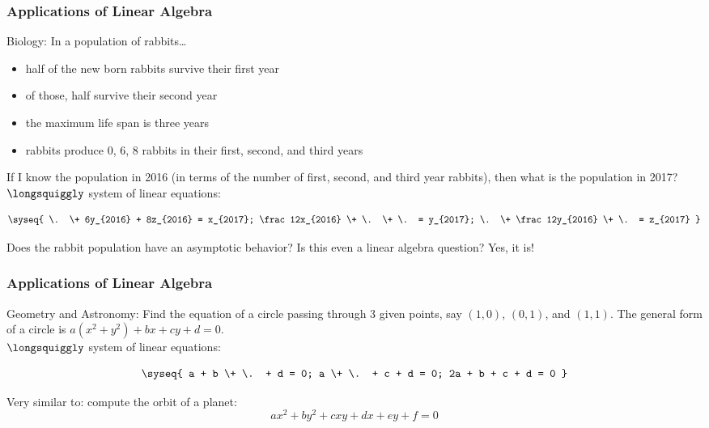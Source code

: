 
\begin{frame}
\frametitle{Applications of Linear Algebra}
\alert{Biology:} In a population of rabbits\ldots
\begin{itemize}
\item half of the new born rabbits survive their first year
\item of those, half survive their second year
\item the maximum life span is three years
\item rabbits produce 0, 6, 8 rabbits in their first, second, and third years
\end{itemize}

\pause\medskip
If I know the population in 2016 (in terms of the number of first, second, and
third year rabbits), then what is the population in 2017?
\pause\\[5mm]
$\longsquiggly$ system of linear equations:

\begin{webonly}
  \[\syseq{
    \. \+ 6y_{2016} + 8z_{2016} = x_{2017};
    \frac 12x_{2016} \+ \. \+ \. = y_{2017};
    \. \+ \frac 12y_{2016} \+ \. = z_{2017} 
  }\]
\end{webonly}

\pause

\begin{ques}
  Does the rabbit population have an asymptotic behavior?  Is this even a linear
  algebra question?
  \pause
  Yes, it is!
\end{ques}

\end{frame}



\begin{frame}
\frametitle{Applications of Linear Algebra}
\alert{Geometry and Astronomy:} Find the equation of a circle passing through 3
given points, say $(1,0)$, $(0,1)$, and $(1,1)$. 
\pause
The general form of a circle is
$a(x^2+y^2)+bx+cy+d=0$.  
\pause\\[5mm]
$\longsquiggly$ system of linear equations: 


\begin{webonly}
  \[\syseq{
    a + b \+ \. + d = 0;
    a \+ \. + c + d = 0;
    2a + b + c + d = 0
  }\]
\end{webonly}

\vfill \vfill

\pause
Very similar to: compute the orbit of a planet: 
\[ ax^2+by^2+cxy+dx+ey+f=0 \]

\end{frame}


